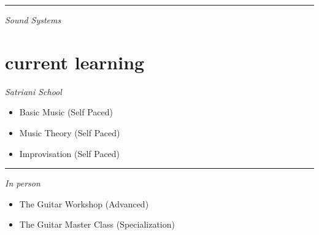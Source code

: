 \documentclass[12pt]{../templates/classes/res}
\begin{document}
\begin{resume}
\begin{minipage}[t]{0.2\linewidth}
{\begin{minipage}[t]{1.0\linewidth}
  \vspace{5pt}
\end{minipage}
\rule{1.0\textwidth}{0.1pt}
\begin{minipage}[t]{1.0\linewidth}
  \vspace{1pt}
  \raggedright{\emph{Sound Systems}}
\end{minipage}
\begin{minipage}[t]{1.0\linewidth}
  \vspace{2pt}
  \vspace{5pt}
\end{minipage}
}
\end{minipage}
\hfill
\begin{minipage}[t]{0.35\linewidth}
  \section{current learning}
  \vspace{10pt}
  \footnotesize{		
\begin{minipage}[t]{1.0\linewidth}
  \vspace{1pt}
  \raggedright{\emph{Satriani School}}
\end{minipage}
\begin{minipage}[t]{1.0\linewidth}
  \begin{flushleft}
  \vspace{2pt}
    \begin{itemize}
      \item Basic Music (Self Paced)
\item Music Theory (Self Paced)
\item Improvisation (Self Paced)

    \end{itemize}
  \end{flushleft}
  \vspace{-8pt}
\end{minipage}
\rule{1.0\textwidth}{0.1pt}
\begin{minipage}[t]{1.0\linewidth}
  \vspace{1pt}
  \raggedright{\emph{In person}}
\end{minipage}
\begin{minipage}[t]{1.0\linewidth}
  \begin{flushleft}
  \vspace{2pt}
    \begin{itemize}
      \item The Guitar Workshop (Advanced)
\item The Guitar Master Class (Specialization)


\end{itemize}
\end{flushleft}
\end{minipage}}
\end{minipage}
\end{resume}
\end{document}
